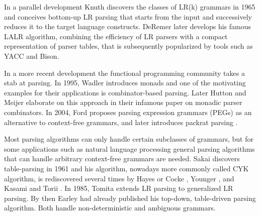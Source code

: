 \begin{isabellebody}
\begin{isamarkuptext}
In a parallel development Knuth \cite{Knuth:1965} discovers the classes of LR(k) grammars in 1965 and
conceives bottom-up LR parsing that starts from the input and successively reduces it to the target
language constructs. DeRemer \cite{DeRemer:1969} later develops his famous LALR algorithm, combining
the efficiency of LR parsers with a compact representation of parser tables, that is subsequently popularized
by tools such as YACC and Bison.

In a more recent development the functional programming community takes a stab at parsing.
In 1995, Wadler \cite{Wadler:1995} introduces monads and one of the motivating examples for their
applications is combinator-based parsing. Later Hutton and Meijer \cite{Hutton:1996} elaborate on this
approach in their infamous paper on monadic parser combinators. In 2004, Ford \cite{Ford:2004}
proposes parsing expression grammars (PEGs) as an alternative to context-free grammars, and later
introduces packrat parsing \cite{Ford:2006}.

Most parsing algorithms can only handle certain subclasses of grammars,
but for some applications such as natural language processing general parsing algorithms that can
handle arbitrary context-free grammars are needed. Sakai \cite{Sakai:1961} discovers table-parsing
in 1961 and his algorithm, nowadays more commonly called CYK algorithm, is rediscovered several times
by Hayes or Cocke \cite{Cocke:1969}, Younger \cite{Younger:1967}, and Kasami and Torii \cite{Kasami:1969}.
In 1985, Tomita \cite{Tomita:1985} extends LR parsing to generalized LR parsing. By then Earley \cite{Earley:1970}
had already published his top-down, table-driven parsing algorithm. Both handle non-deterministic and ambiguous grammars.


\end{isamarkuptext}
\end{isabellebody}
